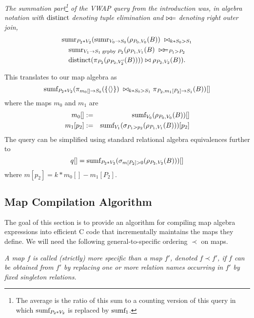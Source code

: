 \begin{example}\em
\label{ex:compiler1}
The summation part\footnote{The average is the ratio
of this sum to a
counting version of this query in which $\mbox{sumf}_{P_2 * V_2}$ is replaced by
$\mbox{sumf}_1$.}
 of the VWAP query from the introduction was, in algebra notation with $\mbox{distinct}$
denoting
tuple elimination and $\bowtie\!=$ denoting right outer join,
\begin{multline*}
\mbox{sumr}_{P_2 * V_2}(\mbox{sumr}_{V_0 \rightarrow S_0}(\rho_{P_0, V_0}(B))
\; \bowtie_{k * S_0 > S_1} \\
\mbox{sumr}_{V_1 \rightarrow S_1 \;\mathrm{grpby}\; P_2}(
\rho_{P_1, V_1}(B) \; \bowtie\!=_{P_1 > P_2} \\
\mbox{distinct}(\pi_{P_2}(\rho_{P_2, V_2'}(B)))) \bowtie \rho_{P_2, V_2}(B)).
\end{multline*}

%
This translates to our map algebra as
\[
\mbox{sumf}_{P_2 * V_2}(
\pi_{m_0[]  \rightarrow S_0}(\{{\langle\rangle}\})
\; \bowtie_{k * S_0 > S_1}
\pi_{P_2, m_1[P_2] \rightarrow S_1}(B))[]
\]
%
where the maps $m_0$ and $m_1$ are
\begin{eqnarray*}
m_0[] &:=&
\mbox{sumf}_{V_0}(\rho_{P_0, V_0}(B))[]
\\
m_1[p_2] &:=&
\mbox{sumf}_{V_1}(\sigma_{P_1 > p_2}(\rho_{P_1, V_1}(B)))[p_2]
\end{eqnarray*}
The query can be simplified using standard relational algebra equivalences
further to
\begin{equation}
q[] = \mbox{sumf}_{P_2 * V_2}(
\sigma_{m[P_2] > 0}(\rho_{P_2, V_2}(B)))[]
\end{equation}
where
$
m[p_2] = k * m_0[] - m_1[P_2].
$
\end{example}



\subsection{Map Compilation Algorithm}


The goal of this section is to provide an algorithm for compiling map algebra
expressions into efficient C code that incrementally maintains the
maps they define.
We will need the following general-to-specific ordering $\prec$ on maps.


\begin{definition}\em
A map $f$ is called (strictly) {\em more specific than}\/ a map $f'$,
denoted $f \prec f'$, if $f$ can be obtained from $f'$ by replacing
one or more relation names occurring in $f'$ by fixed singleton relations.
\end{definition}


